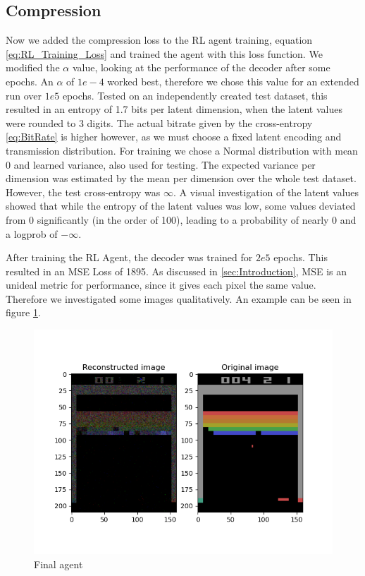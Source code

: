 \subsection{Compression}\label{sub:Results_Compression}
Now we added the compression loss to the RL agent training, equation
\ref{eq:RL_Training_Loss} and trained the agent with this loss function. We
modified the $\alpha$ value, looking at the performance of the decoder after some epochs. An $\alpha$
of $1e-4$ worked best, therefore we chose this value for an extended run over $1e5$ epochs. Tested on an independently created test
dataset, this resulted in an entropy of 1.7 bits per latent dimension, when the
latent values were rounded to 3 digits. The actual bitrate given by the
cross-entropy \ref{eq:BitRate} is higher however, as we must choose a
fixed latent encoding and transmission distribution. For training we chose a Normal distribution with mean 0 and learned variance, also used for testing. The expected variance per dimension was estimated by the mean
per dimension over the whole test dataset. However, the test cross-entropy was $\infty$. A visual investigation of the latent values showed
that while the entropy of the latent values was low, some values deviated from 0 significantly (in the order of 100), leading to a probability of nearly
0 and a logprob of $-\infty$.

After training the RL Agent, the decoder was trained for $2e5$ epochs. This
resulted in an MSE Loss of 1895. As discussed in \ref{sec:Introduction}, MSE
is an unideal metric for performance, since it gives each pixel the same
value. Therefore we investigated some images qualitatively. An example can be seen in figure
\ref{fig:final_agent}.
\begin{figure}[H]
    \centering
    \includegraphics[width=\linewidth]{images/orig_reconstructed_final_agent.png}
    \caption{Final agent}
    \label{fig:final_agent}
\end{figure}

